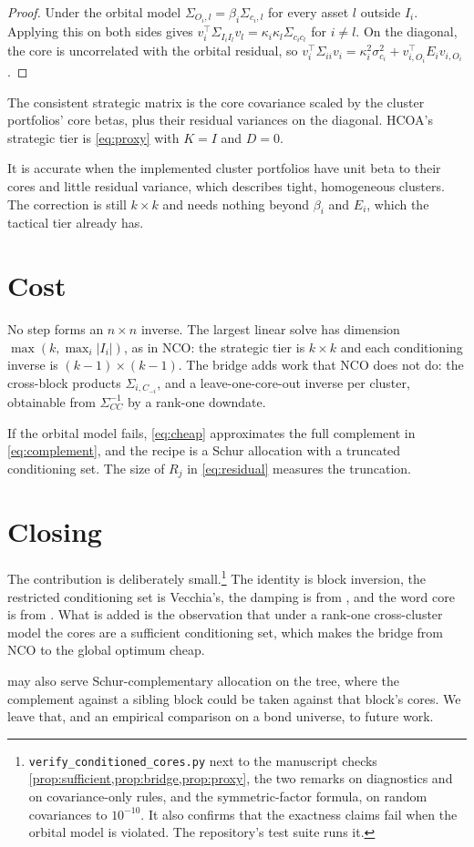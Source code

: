 \documentclass[11pt]{article}
\begin{document}
\begin{proof}
Under the orbital model $\Sigma_{O_i,l}=\beta_i\Sigma_{c_i,l}$ for every
asset $l$ outside $I_i$. Applying this on both sides gives
$v_i^\top\Sigma_{I_iI_l}v_l=\kappa_i\kappa_l\Sigma_{c_ic_l}$ for $i\neq l$.
On the diagonal, the core is uncorrelated with the orbital residual, so
$v_i^\top\Sigma_{ii}v_i=\kappa_i^2\sigma_{c_i}^2+v_{i,O_i}^\top E_iv_{i,O_i}$.
\end{proof}

The consistent strategic matrix is the core covariance scaled by the
cluster portfolios' core betas, plus their residual variances on the
diagonal. HCOA's strategic tier is \eqref{eq:proxy} with $K=I$ and $D=0$.

It is accurate when the implemented cluster portfolios have unit beta to
their cores and little residual variance, which describes tight,
homogeneous clusters. The correction is still $k\times k$ and needs nothing
beyond $\beta_i$ and $E_i$, which the tactical tier already has.

\section{Cost}

No step forms an $n\times n$ inverse. The largest linear solve has dimension
$\max(k,\max_i|I_i|)$, as in NCO: the strategic tier is $k\times k$ and each
conditioning inverse is $(k-1)\times(k-1)$. The bridge adds work that NCO does not
do: the cross-block products $\Sigma_{i,C_{-i}}$, and a leave-one-core-out
inverse per cluster, obtainable from $\Sigma_{CC}^{-1}$ by a rank-one
downdate.

If the orbital model fails, \eqref{eq:cheap} approximates the full
complement in \eqref{eq:complement}, and the recipe is a Schur allocation
with a truncated conditioning set. The size of $R_j$ in
\eqref{eq:residual} measures the truncation.

\section{Closing}

The contribution is deliberately small.\footnote{\texttt{verify\_conditioned\_cores.py}
next to the manuscript checks \cref{prop:sufficient,prop:bridge,prop:proxy},
the two remarks on diagnostics and on covariance-only rules, and the
symmetric-factor formula, on random covariances to $10^{-10}$. It also
confirms that the exactness claims fail when the orbital model is violated.
The repository's test suite runs it.} The identity is block inversion, the
restricted conditioning set is Vecchia's, the damping is from
\textcite{cotton2024schur}, and the word core is from \textcite{hcoa2026}. What is added is the observation that under a
rank-one cross-cluster model the cores are a sufficient conditioning set,
which makes the bridge from NCO to the global optimum cheap.

 may also serve Schur-complementary allocation on the
tree, where the complement against a sibling block could be taken against
that block's cores. We leave that, and an empirical comparison on a bond
universe, to future work.

\printbibliography
\end{document}
